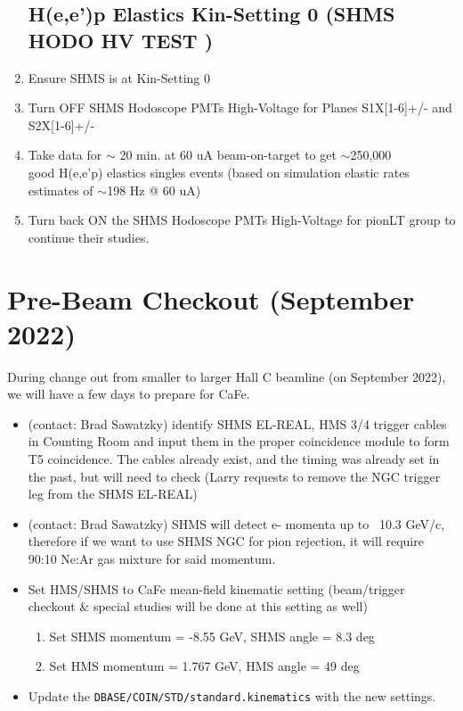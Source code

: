 \documentclass{article}
\begin{document}
  \begin{enumerate}
    \subsection*{H(e,e')p Elastics Kin-Setting 0 (SHMS HODO HV TEST )}
    \item Ensure SHMS is at Kin-Setting 0
    \item Turn OFF SHMS Hodoscope PMTs High-Voltage for Planes S1X[1-6]+/- and S2X[1-6]+/- 
    \item Take data for $\sim$ 20  min. at 60 uA beam-on-target to get $\sim$250,000 \\
     good H(e,e'p) elastics singles events (based on simulation elastic rates estimates of $\sim$198 Hz @ 60 uA)
     \item  Turn back ON the SHMS Hodoscope PMTs High-Voltage for pionLT group to continue their studies.
    \end{enumerate}

    


\section{Pre-Beam Checkout (September 2022)}
 During change out from smaller to larger Hall C beamline (on September 2022), we will have a few days to prepare for CaFe.
 \begin{itemize}
 \item (contact: Brad Sawatzky) identify SHMS EL-REAL, HMS 3/4 trigger cables in Counting Room and input them
 in the proper coincidence module to form T5 coincidence. The cables already
 exist, and the timing was already set in the past, but will need to check
 (Larry requests to remove the NGC trigger leg from the SHMS EL-REAL)

\item (contact: Brad Sawatzky) SHMS will detect e- momenta up to ~10.3 GeV/c, therefore if we want to use SHMS NGC for pion rejection, it will require ~ 90:10 Ne:Ar gas mixture for said momentum.

\item Set HMS/SHMS to CaFe mean-field kinematic setting (beam/trigger checkout \& special studies will be done at this setting as well) 

    \begin{enumerate}
    \item Set SHMS momentum = -8.55 GeV, SHMS angle = 8.3 deg  
    \item Set HMS momentum = 1.767 GeV, HMS angle = 49 deg
    \end{enumerate}
 
\item Update the \texttt{DBASE/COIN/STD/standard.kinematics} with the new settings.
\end{itemize}
\end{document}
